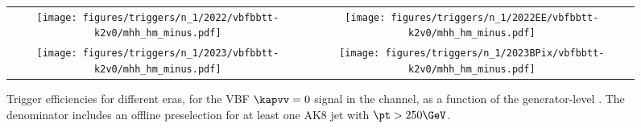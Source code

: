 
    \begin{figure}[H]
        \centering
        \begin{tabular}{cc}
            \texttt{[image: figures/triggers/n\_1/2022/vbfbbtt-k2v0/mhh\_hm\_minus.pdf]} &
            \texttt{[image: figures/triggers/n\_1/2022EE/vbfbbtt-k2v0/mhh\_hm\_minus.pdf]} \\[1ex]
            \texttt{[image: figures/triggers/n\_1/2023/vbfbbtt-k2v0/mhh\_hm\_minus.pdf]} &
            \texttt{[image: figures/triggers/n\_1/2023BPix/vbfbbtt-k2v0/mhh\_hm\_minus.pdf]}
            \label{fig}
        \end{tabular}
\caption{Trigger efficiencies for different eras, for the VBF \HHbbtt $\kapvv=0$ signal in the \tauhm channel, as a function of the generator-level \mHH. The denominator includes an offline preselection for at least one AK8 jet with $\pt > 250\GeV$.}
\label{fig:triggers_n-1_vbfbbtt-k2v0_hm_mhh}
\end{figure}
